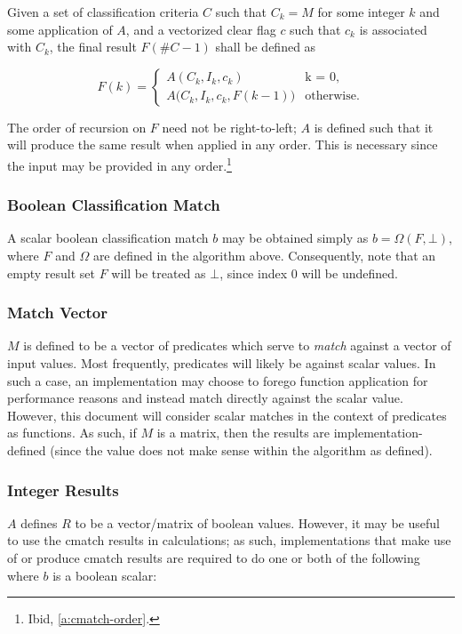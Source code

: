 Given a set of classification criteria $C$ such that $C_k = M$ for some integer
$k$ and some application of $A$, and a vectorized clear flag $c$ such that $c_k$
is associated with $C_k$, the final result $F(\#C-1)$ shall be defined as

$$
  F(k) = \left\{
    \begin{array}{ll}
      A\left(C_k,I_k,c_k\right) & \textrm{k = 0,} \\
      A\bigl(C_k,I_k,c_k,F\!\left(k-1\right)\bigr) & \textrm{otherwise.}
    \end{array}
  \right.
$$

The order of recursion on $F$ need not be right-to-left; $A$ is defined such
that it will produce the same result when applied in any order. This is
necessary since the input may be provided in any order.\footnote{Ibid,
\ref{a:cmatch-order}.}

\subsubsection{Boolean Classification Match}
\label{s:cmatch-boolean}
A scalar boolean classification match $b$ may be obtained simply as $b =
\Omega\left(F,\bot\right)$, where $F$ and $\Omega$ are defined in the algorithm
above. Consequently, note that an empty result set $F$ will be treated as
$\bot$, since index $0$ will be undefined.

\subsubsection{Match Vector}
$M$ is defined to be a vector of predicates which serve to {\sl match} against a
vector of input values. Most frequently, predicates will likely be against scalar
values. In such a case, an implementation may choose to forego function
application for performance reasons and instead match directly against the
scalar value. However, this document will consider scalar matches in the context
of predicates as functions. As such, if $M$ is a matrix, then the results are
implementation-defined (since the value does not make sense within the algorithm
as defined).

\subsubsection{Integer Results}
\label{s:cmatch-int}
$A$ defines $R$ to be a vector/matrix of boolean values. However, it may be
useful to use the cmatch results in calculations; as such, implementations that
make use of or produce cmatch results are required to do one or both of the
following where $b$ is a boolean scalar:

